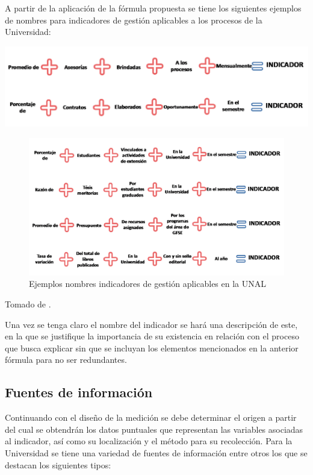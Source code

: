 \documentclass[
]{book}
\begin{document}
A partir de la aplicación de la fórmula propuesta se tiene los siguientes ejemplos de nombres para indicadores de gestión aplicables a los procesos de la Universidad:

\begin{center}\includegraphics[width=0.9\linewidth]{Imagenes/figura_16} \end{center}

\begin{figure}

{\centering \includegraphics[width=0.9\linewidth]{Imagenes/figura_17} 

}

\caption{Ejemplos nombres indicadores de gestión aplicables en la UNAL}\label{fig:unnamed-chunk-13}
\end{figure}

Tomado de \citet{publica2015guia}.

Una vez se tenga claro el nombre del indicador se hará una descripción de este, en la que se justifique la importancia de su existencia en relación con el proceso que busca explicar sin que se incluyan los elementos mencionados en la anterior fórmula para no ser redundantes.

\hypertarget{fuentes-de-informaciuxf3n}{%
\subsection{Fuentes de información}\label{fuentes-de-informaciuxf3n}}

Continuando con el diseño de la medición se debe determinar el origen a partir del cual se obtendrán los datos puntuales que representan las variables asociadas al indicador, así como su localización y el método para su recolección. Para la Universidad se tiene una variedad de fuentes de información entre otros los que se destacan los siguientes tipos:
\end{document}

